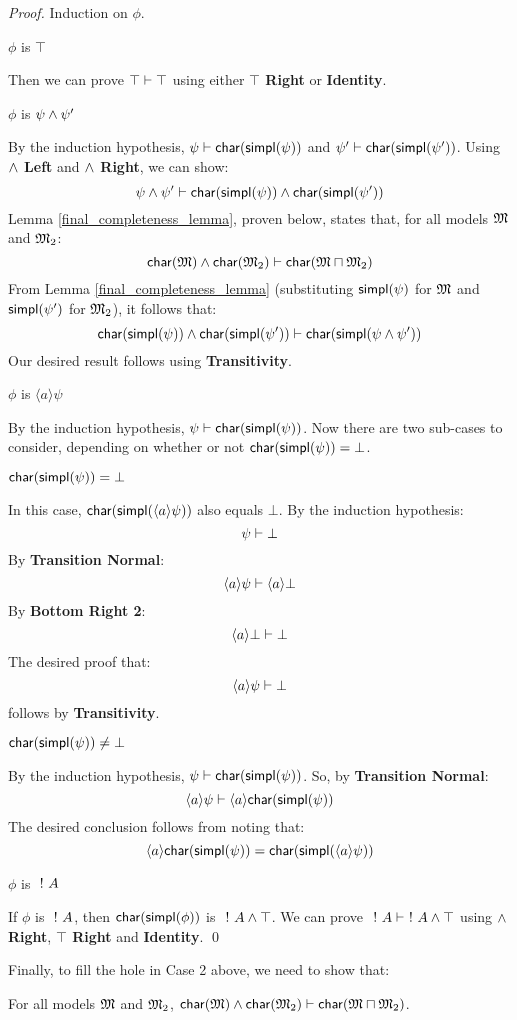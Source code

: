 \begin{proof}
Induction on $\phi$.

\setcounter{mycase}{0}

\begin{mycase}
$\phi$ is $\top$
\end{mycase}
Then we can prove  $\top \vdash \top$ using either {\bf $\top$ Right} or {\bf Identity}.

\begin{mycase}
$\phi$ is $\psi \land \psi'$
\end{mycase}
By the induction hypothesis, $\psi \vdash  \mathsf{char}(\mathsf{simpl}(\psi))$ and $\psi' \vdash  \mathsf{char}(\mathsf{simpl}(\psi'))$.
Using {\bf $\land$ Left} and {\bf $\land$ Right}, we can show:
\[
\psi \land \psi' \vdash  \mathsf{char}(\mathsf{simpl}(\psi)) \land  \mathsf{char}(\mathsf{simpl}(\psi'))
\]
Lemma \ref{final_completeness_lemma}, proven below, states that, for all models $\frak{M}$ and $\frak{M}_2$:
\[
  \mathsf{char}(\frak{M}) \land  \mathsf{char}(\frak{M}_2) \vdash  \mathsf{char}(\frak{M} \sqcap \frak{M}_2)
\]
From Lemma \ref{final_completeness_lemma} (substituting $\mathsf{simpl}(\psi)$ for $\frak{M}$ and $\mathsf{simpl}(\psi')$ for $\frak{M}_2$), it follows that:
\[
 \mathsf{char}(\mathsf{simpl}(\psi)) \land  \mathsf{char}(\mathsf{simpl}(\psi')) \vdash  \mathsf{char}(\mathsf{simpl}(\psi \land \psi'))
\]
Our desired result follows using {\bf Transitivity}.

\begin{mycase}
$\phi$ is $\langle a \rangle \psi$
\end{mycase}
By the induction hypothesis, $\psi \vdash  \mathsf{char}(\mathsf{simpl}(\psi))$.
Now there are two sub-cases to consider, depending on whether or not $ \mathsf{char}(\mathsf{simpl}(\psi)) = \bot$.
\begin{subcase}
$ \mathsf{char}(\mathsf{simpl}(\psi)) = \bot$
\end{subcase}
In this case, $ \mathsf{char}(\mathsf{simpl}(\langle a \rangle \psi))$ also equals $\bot$. 
By the induction hypothesis:
\[
\psi \vdash \bot
\]
By {\bf Transition Normal}:
\[
\langle a \rangle \psi \vdash \langle a \rangle \bot
\]
By {\bf Bottom Right 2}:
\[
\langle a \rangle \bot \vdash \bot
\]
The desired proof that:
\[
\langle a \rangle \psi \vdash \bot
\]
follows by {\bf Transitivity}.
\begin{subcase}
$ \mathsf{char}(\mathsf{simpl}(\psi)) \neq \bot$
\end{subcase}
By the induction hypothesis, $\psi \vdash  \mathsf{char}(\mathsf{simpl}(\psi))$.
So, by {\bf Transition Normal}:
\[
\langle a \rangle \psi \vdash \langle a \rangle  \mathsf{char}(\mathsf{simpl}(\psi))
\]
The desired conclusion follows from noting that:
\[
 \langle a \rangle  \mathsf{char}(\mathsf{simpl}(\psi)) =  \mathsf{char}(\mathsf{simpl}(\langle a \rangle \psi))
 \]
 \begin{mycase}
$\phi$ is $\ ! \  A$
\end{mycase}
If $\phi$ is $\ ! \  A$, then $  \mathsf{char}(\mathsf{simpl}(\phi))$ is $\ ! \  A \land \top$.
We can prove $\ ! \  A \vdash \ ! \  A \land \top$ using {\bf $\land$ Right}, {\bf $\top$ Right} and {\bf Identity}.
\qed
\end{proof}
Finally, to fill the hole in Case 2 above, we need to show that:
\begin{lemma}
\label{final_completeness_lemma}
For all models $\frak{M}$ and $\frak{M}_2$, $  \mathsf{char}(\frak{M}) \land  \mathsf{char}(\frak{M}_2) \vdash  \mathsf{char}(\frak{M} \sqcap \frak{M}_2)$.
\end{lemma}

